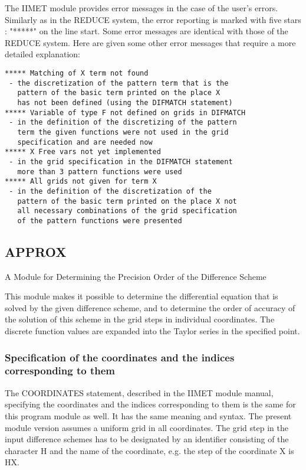      The IIMET  module provides error messages in the case of the user's
errors. Similarly as in the REDUCE system, the error reporting is marked
with five  stars :  "*****" on  the line  start. Some error messages are
identical with those of  the REDUCE  system. Here  are given  some other
error messages that require a more detailed explanation:
{\small\begin{verbatim}
***** Matching of X term not found
 - the discretization of the pattern term that is the
   pattern of the basic term printed on the place X
   has not been defined (using the DIFMATCH statement)
***** Variable of type F not defined on grids in DIFMATCH
 - in the definition of the discretizing of the pattern
   term the given functions were not used in the grid
   specification and are needed now
***** X Free vars not yet implemented
 - in the grid specification in the DIFMATCH statement
   more than 3 pattern functions were used
***** All grids not given for term X
 - in the definition of the discretization of the
   pattern of the basic term printed on the place X not
   all necessary combinations of the grid specification
   of the pattern functions were presented
\end{verbatim}}


\subsection{APPROX}



             A Module for Determining the Precision Order
                       of the Difference Scheme



     This  module  makes  it  possible  to  determine  the  differential
equation that is solved by the given difference scheme, and to determine
the order  of accuracy  of the solution of this scheme in the grid steps
in individual coordinates. The  discrete  function  values  are expanded
into the Taylor series in the specified point.


\subsubsection{Specification of the coordinates and the indices
    corresponding to them}


     The COORDINATES  statement, described  in the  IIMET module manual,
specifying the coordinates and the indices corresponding to  them is the
same  for  this  program  module  as  well.  It has the same meaning and
syntax. The  present  module  version  assumes  a  uniform  grid  in all
coordinates. The  grid step  in the  input difference  schemes has to be
designated by an identifier consisting of the character  H and  the name
of the coordinate, e.g. the step of the coordinate X is HX.


